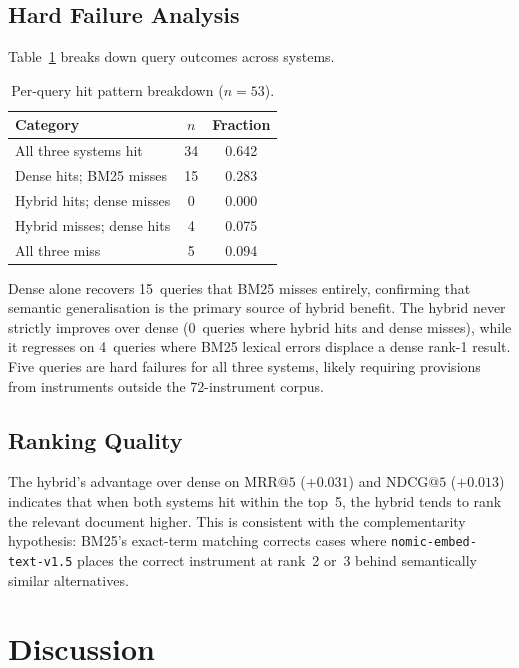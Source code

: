 \documentclass[conference]{IEEEtran}
\makeatletter
\newcommand{\nomic}{\texttt{nomic-embed-text-v1.5}\xspace}
\newcommand{\MRR}[1]{\mathrm{MRR}@{#1}}
\newcommand{\NDCG}[1]{\mathrm{NDCG}@{#1}}
\makeatother
\begin{document}
\subsection{Hard Failure Analysis}

Table~\ref{tab:reliability} breaks down query outcomes across systems.

\begin{table}[!t]
\renewcommand{\arraystretch}{1.3}
\caption{Per-query hit pattern breakdown ($n{=}53$).}
\label{tab:reliability}
\centering
\small
\begin{tabular}{@{}lcc@{}}
\toprule
Category & $n$ & Fraction \\
\midrule
All three systems hit        & 34 & 0.642 \\
Dense hits; BM25 misses      & 15 & 0.283 \\
Hybrid hits; dense misses    &  0 & 0.000 \\
Hybrid misses; dense hits    &  4 & 0.075 \\
All three miss               &  5 & 0.094 \\
\bottomrule
\end{tabular}
\end{table}

Dense alone recovers 15~queries that BM25 misses entirely, confirming
that semantic generalisation is the primary source of hybrid benefit.
The hybrid never strictly improves over dense (0~queries where hybrid
hits and dense misses), while it regresses on 4~queries where BM25
lexical errors displace a dense rank-1 result.
Five queries are hard failures for all three systems, likely requiring
provisions from instruments outside the 72-instrument corpus.

\subsection{Ranking Quality}

The hybrid's advantage over dense on $\MRR{5}$ ($+0.031$) and
$\NDCG{5}$ ($+0.013$) indicates that when both systems hit within
the top~5, the hybrid tends to rank the relevant document higher.
This is consistent with the complementarity hypothesis: BM25's
exact-term matching corrects cases where \nomic places the correct
instrument at rank~2 or~3 behind semantically similar alternatives.

\section{Discussion}
\end{document}
